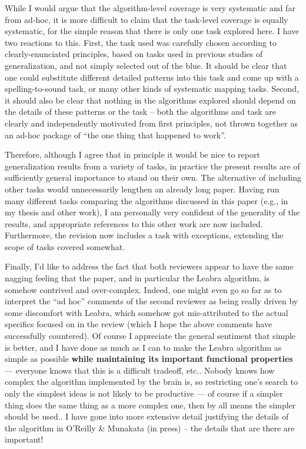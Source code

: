 \documentclass [11pt]{letter}
\begin{document}
\begin{letter}
While I would argue that the algorithm-level coverage is very
systematic and far from ad-hoc, it is more difficult to claim that the
task-level coverage is equally systematic, for the simple reason that
there is only one task explored here.  I have two reactions to this.
First, the task used was carefully chosen according to
clearly-enunciated principles, based on tasks used in previous studies
of generalization, and not simply selected out of the blue.  It should
be clear that one could substitute different detailed patterns into
this task and come up with a spelling-to-sound task, or many other
kinds of systematic mapping tasks.  Second, it should also be clear
that nothing in the algorithms explored should depend on the details
of these patterns or the task -- both the algorithms and task are
clearly and independently motivated from first principles, not thrown
together as an ad-hoc package of ``the one thing that happened to
work''.

Therefore, although I agree that in principle it would be nice to
report generalization results from a variety of tasks, in practice the
present results are of sufficiently general importance to stand on
their own.  The alternative of including other tasks would
unnecessarily lengthen an already long paper.  Having run many
different tasks comparing the algorithms discussed in this paper
(e.g., in my thesis and other work), I am personally very confident of
the generality of the results, and appropriate references to this
other work are now included.  Furthermore, the revision now includes a
task with exceptions, extending the scope of tasks covered somewhat.

Finally, I'd like to address the fact that both reviewers appear to
have the same nagging feeling that the paper, and in particular the
Leabra algorithm, is somehow contrived and over-complex.  Indeed, one
might even go so far as to interpret the ``ad hoc'' comments of the
second reviewer as being really driven by some discomfort with Leabra,
which somehow got mis-attributed to the actual specifics focused on in
the review (which I hope the above comments have successfully
countered).  Of course I appreciate the general sentiment that simple
is better, and I have done as much as I can to make the Leabra
algorithm as simple as possible {\bf while maintaining its important
  functional properties} --- everyone knows that this is a difficult
tradeoff, etc..  Nobody knows how complex the algorithm implemented by
the brain is, so restricting one's search to only the simplest ideas
is not likely to be productive --- of course if a simpler thing does
the same thing as a more complex one, then by all means the simpler
should be used.. I have gone into more extensive detail justifying the
details of the algorithm in O'Reilly \& Munakata (in press) -- the
details that are there are important!


\end{letter}
\end{document}
